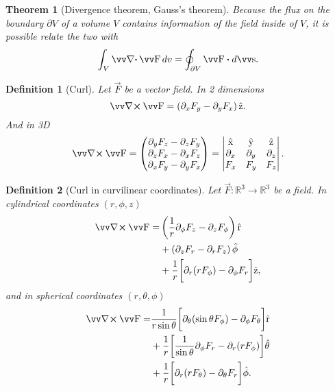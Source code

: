 \documentclass[margin=small]{tex/hsrzf}
\theoremstyle{elmagzf}
\newtheorem{theorem}{Theorem}
\newtheorem{definition}{Definition}
\begin{document}
\begin{theorem}[Divergence theorem, Gauss's theorem]
  Because the flux on the boundary \(\partial V\) of a volume \(V\) contains
  information of the field inside of \(V\), it is possible relate the two with
  \[
    \int_V \div \vec{F} \,dv = \oint_{\partial V} \vec{F} \dotp d\vec{s} .
  \]
\end{theorem}

\begin{definition}[Curl]
  Let \(\vec{F}\) be a vector field. In 2 dimensions
  \[
    \curl \vec{F} = \left(\partial_x F_y - \partial_y F_x\right)\uvec{z}.
  \]
  And in 3D
  \[
    \curl \vec{F} = \begin{pmatrix}
      \partial_y F_z - \partial_z F_y \\
      \partial_z F_x - \partial_x F_z \\
      \partial_x F_y - \partial_y F_x
    \end{pmatrix}
    = \begin{vmatrix}
      \uvec{x} & \uvec{y} & \uvec{z} \\
      \partial_x & \partial_y & \partial_z \\
      F_x & F_y & F_z
    \end{vmatrix} .
  \]
\end{definition}

\begin{definition}[Curl in curvilinear coordinates]
  Let \(\vec{F}: \mathbb{R}^3 \to \mathbb{R}^3\) be a field. In cylindrical
  coordinates \((r,\phi,z)\)
  \begin{align*}
    \curl \vec{F} =
      &\left(\frac{1}{r} \partial_\phi F_z - \partial_z F_\phi \right) \uvec{r} \\
      &+ \left(\partial_z F_r - \partial_r F_z \right) \uvec{\phi} \\
      &+ \frac{1}{r} \bigg[
        \partial_r (rF_\phi) - \partial_\phi F_r
        \bigg] \uvec{z},
  \end{align*}
  and in spherical coordinates \((r,\theta,\phi)\)
  \begin{align*}
      \curl \vec{F} =
        &\frac{1}{r \sin\theta} \bigg[
          \partial_\theta (\sin\theta F_\phi) - \partial_\phi F_\theta
        \bigg] \uvec{r} \\
        &+ \frac{1}{r} \bigg[
          \frac{1}{\sin\theta} \partial_\phi F_r - \partial_r (r F_\phi)
        \bigg] \uvec{\theta} \\
        &+ \frac{1}{r} \bigg[
          \partial_r (r F_\theta) - \partial_\theta F_r
        \bigg] \uvec{\phi} .
  \end{align*}
\end{definition}
\end{document}
